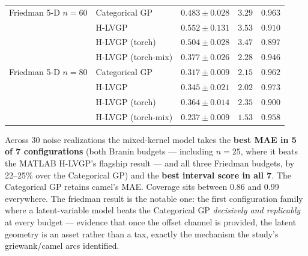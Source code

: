 \documentclass[11pt]{article}
\begin{document}
\begin{table}[htbp]
\begin{tabular}{llrrr}
\midrule
Friedman 5-D $n{=}60$ & Categorical GP & $0.483 \pm 0.028$ & $3.29$ & $0.963$ \\
 & H-LVGP & $0.552 \pm 0.131$ & $3.53$ & $0.910$ \\
 & H-LVGP (torch) & $0.504 \pm 0.028$ & $3.47$ & $0.897$ \\
 & H-LVGP (torch-mix) & \textbf{$0.377 \pm 0.026$} & \textbf{$2.28$} & \textbf{$0.946$} \\
\midrule
Friedman 5-D $n{=}80$ & Categorical GP & $0.317 \pm 0.009$ & $2.15$ & $0.962$ \\
 & H-LVGP & $0.345 \pm 0.021$ & $2.02$ & $0.973$ \\
 & H-LVGP (torch) & $0.364 \pm 0.014$ & $2.35$ & $0.900$ \\
 & H-LVGP (torch-mix) & \textbf{$0.237 \pm 0.009$} & \textbf{$1.53$} & \textbf{$0.958$} \\
\bottomrule
\end{tabular}
\end{table}

Across 30 noise realizations the mixed-kernel model takes the \textbf{best MAE in 5 of 7
configurations} (both Branin budgets --- including $n{=}25$, where it beats the MATLAB
H-LVGP's flagship result --- and all three Friedman budgets, by 22--25\% over the Categorical
GP) and the \textbf{best interval score in all 7}. The Categorical GP retains camel's MAE.
Coverage sits between 0.86 and 0.99 everywhere. The friedman result is the notable one: the
first configuration family where a latent-variable model beats the Categorical GP
\emph{decisively and replicably} at every budget --- evidence that once the offset channel is
provided, the latent geometry is an asset rather than a tax, exactly the mechanism the
study's griewank/camel arcs identified.
\end{document}

